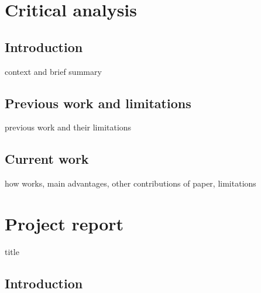 \documentclass[10pt]{article}
\title{\todo}
\author{Kenny Chiu}
\date{\today}
\begin{document}
\maketitle


\section{Critical analysis}

\subsection{Introduction}

\todo context and brief summary

\subsection{Previous work and limitations}

\todo previous work and their limitations

\subsection{Current work}

\todo how \uivi works, main advantages, other contributions of paper, limitations


\newpage


\section{Project report}

\todo title

\vspace{2em}
\begin{abstract}
\todo
\end{abstract}
\vspace{2em}

\subsection{Introduction}
\end{document}
